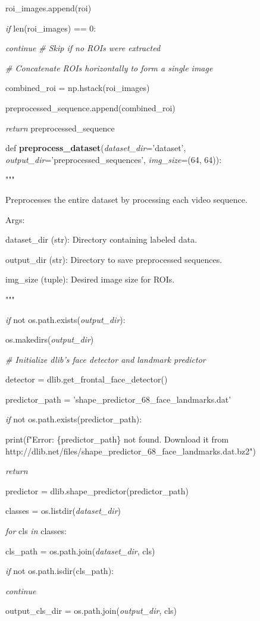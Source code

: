 \documentclass[
]{article}
\begin{document}
roi\_images.append(roi)

\emph{if} len(roi\_images) == 0:

\emph{continue} \emph{\# Skip if no ROIs were extracted}

\emph{\# Concatenate ROIs horizontally to form a single image}

combined\_roi = np.hstack(roi\_images)

preprocessed\_sequence.append(combined\_roi)

\emph{return} preprocessed\_sequence

def \textbf{preprocess\_dataset}(\emph{dataset\_dir}='dataset', \emph{output\_dir}='preprocessed\_sequences', \emph{img\_size}=(64, 64)):

"""

Preprocesses the entire dataset by processing each video sequence.

Args:

dataset\_dir (str): Directory containing labeled data.

output\_dir (str): Directory to save preprocessed sequences.

img\_size (tuple): Desired image size for ROIs.

"""

\emph{if} not os.path.exists(\emph{output\_dir}):

os.makedirs(\emph{output\_dir})

\emph{\# Initialize dlib's face detector and landmark predictor}

detector = dlib.get\_frontal\_face\_detector()

predictor\_path = 'shape\_predictor\_68\_face\_landmarks.dat'

\emph{if} not os.path.exists(predictor\_path):

print(f"Error: \{predictor\_path\} not found. Download it from http://dlib.net/files/shape\_predictor\_68\_face\_landmarks.dat.bz2")

\emph{return}

predictor = dlib.shape\_predictor(predictor\_path)

classes = os.listdir(\emph{dataset\_dir})

\emph{for} cls \emph{in} classes:

cls\_path = os.path.join(\emph{dataset\_dir}, cls)

\emph{if} not os.path.isdir(cls\_path):

\emph{continue}

output\_cls\_dir = os.path.join(\emph{output\_dir}, cls)
\end{document}
